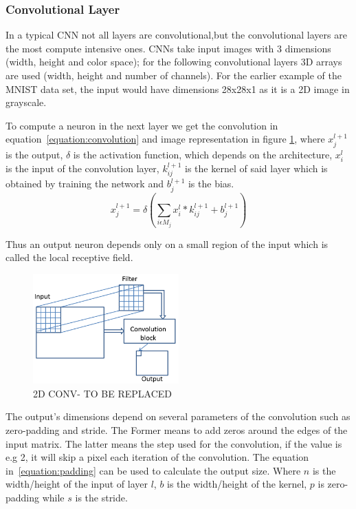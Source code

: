 
 \subsubsection{Convolutional Layer}
\label{section:convlayer}

In a typical CNN not all layers are convolutional,but the convolutional layers
are the most compute intensive ones. CNNs take input images with 3 dimensions
(width, height and color space); for the following convolutional layers 3D
arrays are used (width, height and number of channels). For the earlier example
of the MNIST data set, the input would have dimensions 28x28x1 as it is a 2D
image in grayscale.

To compute a neuron in the next layer we get the convolution in
equation~\ref{equation:convolution} and image representation in figure \ref{Cl},
where $x_{j}^{l+1}$ is the output, $\delta$ is the activation function, which
depends on the architecture, $x_{i}^{l}$ is the input of the convolution layer,
$k_{ij}^{l+1}$ is the kernel of said layer which is obtained by training the
network and $b_{j}^{l+1}$ is the bias.
\begin{equation} \label{equation:convolution}
    \displaystyle x_{j}^{l+1}=\delta (\sum_{i \epsilon M_{j}}x_{i}^{l} * k_{ij}^{l+1}+ b_{j}^{l+1})
\end{equation}

Thus an output neuron depends only on a small region of the input which is
called the local receptive field.

\begin{figure}[!htbp]
    \centering
    \includegraphics[width=0.5\textwidth]{Figures/convolution.png}
    \caption{2D CONV- TO BE REPLACED}
    \label{Cl}
\end{figure} 

The output's dimensions depend on several parameters of the convolution such as
zero-padding and stride. The Former means to add zeros around the edges of the
input matrix. The latter means the step used for the convolution, if the value
is e.g 2, it will skip a pixel each iteration of the convolution.  The equation
in~\ref{equation:padding} can be used to calculate the output size. Where $n$ is
the width/height of the input of layer $l$, $ b$ is the width/height of the
kernel, $p$ is zero-padding while $s$ is the stride.

